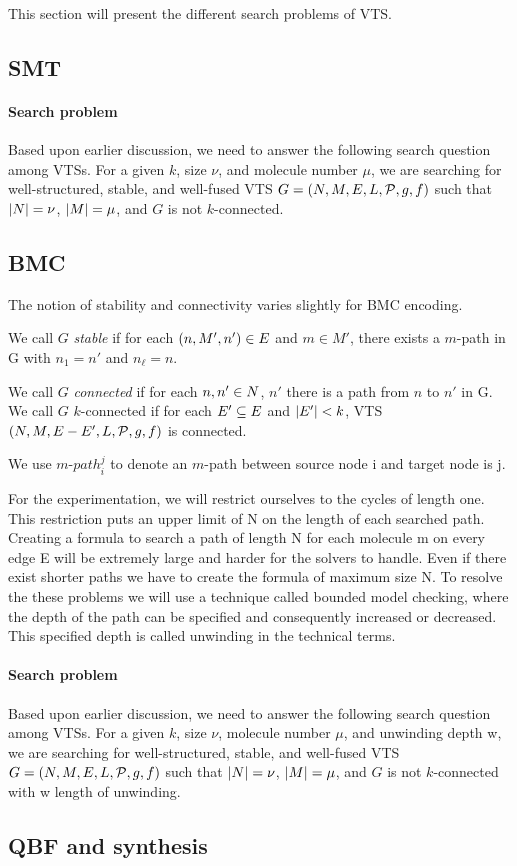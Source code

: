This section will present the different search problems of VTS.

\subsection{SMT}
\paragraph{Search problem}
Based upon earlier discussion, we need to answer the following search
question among VTSs.
For a given $k$, size $\nu$, and molecule number $\mu$,
we are searching for well-structured, stable, and well-fused VTS
$G = (N,M,E,L,\mathcal{P},g,f)$ such that
$|N| = \nu$, $|M| = \mu$, and
$G$ is not $k$-connected.    

\subsection{BMC}
The notion of stability and connectivity varies slightly for BMC encoding. 

%
We call $G$ {\em stable} if for each $(n,M',n') \in E$ and $m \in M'$,
there exists a $m$-path in G with $n_1 = n'$ and $n_\ell = n$.
%

%
We call $G$ {\em connected} if for each $n,n' \in N$,
$n'$ there is a path from $n$ to $n'$ in G.
%
We call $G$ $k$-connected if for each $E' \subseteq E$ and $|E'| < k$,
VTS $(N,M,E-E',L,\mathcal{P},g,f)$ is connected.
%

We use $m$-${path}_i^j$ to denote an $m$-path between source node i and target node is j. 

For the experimentation, we will restrict ourselves to the cycles of length one. 
%
This restriction puts an upper limit of N on the length of each searched path. 
%
Creating a formula to search a path of length N for each molecule m on every edge E will be extremely large and harder for the solvers to handle.  
%
Even if there exist shorter paths we have to create the formula of maximum size N. 
% 
To resolve the these problems we will use a technique called bounded model checking, where the depth of the path can be specified and consequently increased or decreased.  
%
This specified depth is called unwinding in the technical terms.

\paragraph{Search problem}
Based upon earlier discussion, we need to answer the following search
question among VTSs.
For a given $k$, size $\nu$, molecule number $\mu$, and unwinding depth w,
we are searching for well-structured, stable, and well-fused VTS
$G = (N,M,E,L,\mathcal{P},g,f)$ such that
$|N| = \nu$, $|M| = \mu$, and $G$ is not $k$-connected with w length of unwinding.    

\subsection{QBF and synthesis}



             
